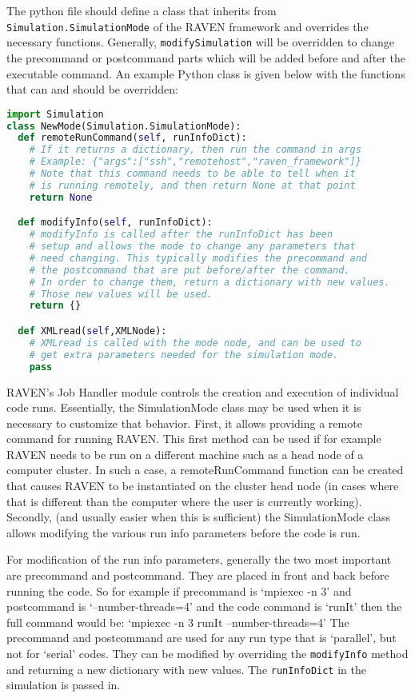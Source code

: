 The python file should define a class that inherits from
\texttt{Simulation.SimulationMode} of the RAVEN framework and overrides the
necessary functions. Generally, \texttt{modifySimulation} will be overridden to
change the precommand or postcommand parts which will be added before and after
the executable command.
%
An example Python class is given below with the functions that can and should be
overridden:

\begin{lstlisting}[language=python]
import Simulation
class NewMode(Simulation.SimulationMode):
  def remoteRunCommand(self, runInfoDict):
    # If it returns a dictionary, then run the command in args
    # Example: {"args":["ssh","remotehost","raven_framework"]}
    # Note that this command needs to be able to tell when it
    # is running remotely, and then return None at that point
    return None

  def modifyInfo(self, runInfoDict):
    # modifyInfo is called after the runInfoDict has been
    # setup and allows the mode to change any parameters that
    # need changing. This typically modifies the precommand and
    # the postcommand that are put before/after the command.
    # In order to change them, return a dictionary with new values.
    # Those new values will be used.
    return {}

  def XMLread(self,XMLNode):
    # XMLread is called with the mode node, and can be used to
    # get extra parameters needed for the simulation mode.
    pass
\end{lstlisting}

RAVEN's Job Handler module controls the creation and execution of
individual code runs. Essentially, the SimulationMode class may be
used when it is necessary to customize that behavior. First, it allows
providing a remote command for running RAVEN. This first method can be
used if for example RAVEN needs to be run on a different machine such
as a head node of a computer cluster. In such a case, a
remoteRunCommand function can be created that causes RAVEN to be
instantiated on the cluster head node (in cases where that is
different than the computer where the user is currently working).
Secondly, (and usually easier when this is sufficient) the
SimulationMode class allows modifying the various run info parameters
before the code is run.

For modification of the run info parameters, generally the two most
important are precommand and postcommand. They are placed in front and
back before running the code.  So for example if precommand is
`mpiexec -n 3' and postcommand is `--number-threads=4' and the code
command is `runIt' then the full command would be: `mpiexec -n 3 runIt
--number-threads=4' The precommand and postcommand are used for any
run type that is `parallel', but not for `serial' codes.  They can be
modified by overriding the \verb'modifyInfo' method and returning a
new dictionary with new values.  The \verb'runInfoDict' in the
simulation is passed in.

